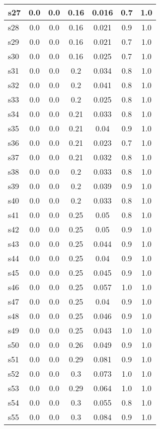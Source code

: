 \documentclass{article}
\begin{document}
\begin{tabular}{|l|c|c|c|c|c|c|}
\hline
s27 &0.0 & 0.0 & 0.16 & 0.016 & 0.7 & 1.0\\
\hline
s28 &0.0 & 0.0 & 0.16 & 0.021 & 0.9 & 1.0\\
\hline
s29 &0.0 & 0.0 & 0.16 & 0.021 & 0.7 & 1.0\\
\hline
s30 &0.0 & 0.0 & 0.16 & 0.025 & 0.7 & 1.0\\
\hline
s31 &0.0 & 0.0 & 0.2 & 0.034 & 0.8 & 1.0\\
\hline
s32 &0.0 & 0.0 & 0.2 & 0.041 & 0.8 & 1.0\\
\hline
s33 &0.0 & 0.0 & 0.2 & 0.025 & 0.8 & 1.0\\
\hline
s34 &0.0 & 0.0 & 0.21 & 0.033 & 0.8 & 1.0\\
\hline
s35 &0.0 & 0.0 & 0.21 & 0.04 & 0.9 & 1.0\\
\hline
s36 &0.0 & 0.0 & 0.21 & 0.023 & 0.7 & 1.0\\
\hline
s37 &0.0 & 0.0 & 0.21 & 0.032 & 0.8 & 1.0\\
\hline
s38 &0.0 & 0.0 & 0.2 & 0.033 & 0.8 & 1.0\\
\hline
s39 &0.0 & 0.0 & 0.2 & 0.039 & 0.9 & 1.0\\
\hline
s40 &0.0 & 0.0 & 0.2 & 0.033 & 0.8 & 1.0\\
\hline
s41 &0.0 & 0.0 & 0.25 & 0.05 & 0.8 & 1.0\\
\hline
s42 &0.0 & 0.0 & 0.25 & 0.05 & 0.9 & 1.0\\
\hline
s43 &0.0 & 0.0 & 0.25 & 0.044 & 0.9 & 1.0\\
\hline
s44 &0.0 & 0.0 & 0.25 & 0.04 & 0.9 & 1.0\\
\hline
s45 &0.0 & 0.0 & 0.25 & 0.045 & 0.9 & 1.0\\
\hline
s46 &0.0 & 0.0 & 0.25 & 0.057 & 1.0 & 1.0\\
\hline
s47 &0.0 & 0.0 & 0.25 & 0.04 & 0.9 & 1.0\\
\hline
s48 &0.0 & 0.0 & 0.25 & 0.046 & 0.9 & 1.0\\
\hline
s49 &0.0 & 0.0 & 0.25 & 0.043 & 1.0 & 1.0\\
\hline
s50 &0.0 & 0.0 & 0.26 & 0.049 & 0.9 & 1.0\\
\hline
s51 &0.0 & 0.0 & 0.29 & 0.081 & 0.9 & 1.0\\
\hline
s52 &0.0 & 0.0 & 0.3 & 0.073 & 1.0 & 1.0\\
\hline
s53 &0.0 & 0.0 & 0.29 & 0.064 & 1.0 & 1.0\\
\hline
s54 &0.0 & 0.0 & 0.3 & 0.055 & 0.8 & 1.0\\
\hline
s55 &0.0 & 0.0 & 0.3 & 0.084 & 0.9 & 1.0\\

\end{tabular}
\end{document}
